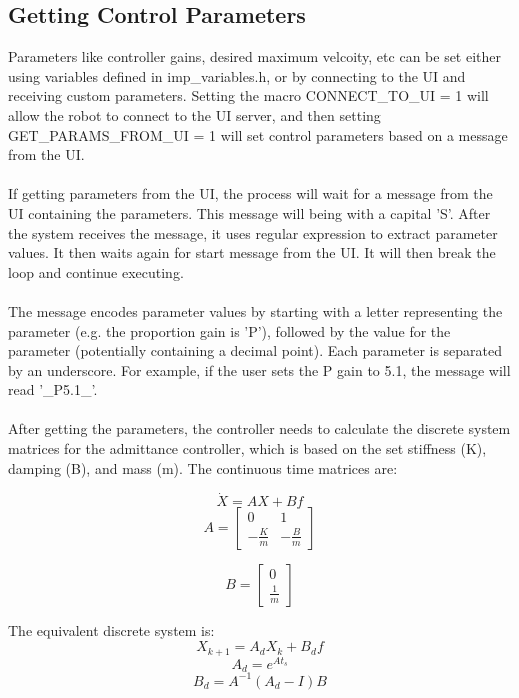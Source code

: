 \documentclass{article}
\begin{document}
	\subsection{Getting Control Parameters}
	Parameters like controller gains, desired maximum velcoity, etc can be set either using variables defined in imp\_variables.h, or by connecting to the UI and receiving custom parameters. Setting the macro CONNECT\_TO\_UI = 1 will allow the robot to connect to the UI server, and then setting GET\_PARAMS\_FROM\_UI = 1 will set control parameters based on a message from the UI.
	\\ \\
	If getting parameters from the UI, the process will wait for a message from the UI containing the parameters. This message will being with a capital 'S'. After the system receives the message, it uses regular expression to extract parameter values. It then waits again for start message from the UI. It will then break the loop and continue executing.
	\\ \\
	The message encodes parameter values by starting with a letter representing the parameter (e.g. the proportion gain is 'P'), followed by the value for the parameter (potentially containing a decimal point). Each parameter is separated by an underscore. For example, if the user sets the P gain to 5.1, the message will read '\_P5.1\_'.
	\\ \\
	After getting the parameters, the controller needs to calculate the discrete system matrices for the admittance controller, which is based on the set stiffness (K), damping (B), and mass (m). The continuous time matrices are:
	
	\begin{equation}
	\dot{X} = AX + Bf
	\end{equation}
	\[
		A=
		\begin{bmatrix}
			0 & 1 \\
			-\frac{K}{m} & -\frac{B}{m}
		\end{bmatrix}
	\]
	
	\[
		B=
		\begin{bmatrix}
			0 \\
			\frac{1}{m}
		\end{bmatrix}
	\]
	
	The equivalent discrete system is:
	\begin{equation}
	X_{k+1} = A_dX_k + B_df
	\end{equation}
	\begin{equation}
	A_d = e^{At_s}
	\end{equation}
	\begin{equation}
	B_d = A^{-1}(A_d - I)B
	\end{equation}
	
\end{document}
